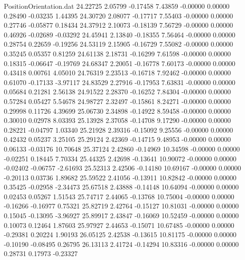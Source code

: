 \begin{filecontents}{PositionOrientation.dat}
  24.22725    2.05799   -0.17458     7.43859   -0.00000    0.00000    0.28490   -0.03235    1.44395
  24.30720    2.08077   -0.17717     7.55403   -0.00000    0.00000    0.27746   -0.05877    0.18434
  24.37912    2.10073   -0.18139     7.56729   -0.00000    0.00000    0.46926   -0.02689   -0.03292
  24.45941    2.13840   -0.18355     7.56464   -0.00000    0.00000    0.28754    0.22659   -0.19256
  24.53119    2.15905   -0.16729     7.55082   -0.00000    0.00000    0.35245    0.05357    0.81259
  24.61138    2.18731   -0.16299     7.61598   -0.00000    0.00000    0.18315   -0.06647   -0.19769
  24.68347    2.20051   -0.16778     7.60173   -0.00000    0.00000    0.43418    0.00761    4.05010
  24.76319    2.23513   -0.16718     7.92462   -0.00000    0.00000    0.61070   -0.17133   -3.97117
  24.83529    2.27916   -0.17953     7.63831   -0.00000    0.00000    0.05684    0.21281    2.56138
  24.91522    2.28370   -0.16252     7.84304   -0.00000    0.00000    0.57284    0.05427    5.54678
  24.98727    2.32497   -0.15861     8.24271   -0.00000    0.00000    0.29998    0.11726    4.39699
  25.06730    2.34898   -0.14922     8.59458   -0.00000    0.00000    0.30010    0.02978    8.03393
  25.13928    2.37058   -0.14708     9.17290   -0.00000    0.00000    0.28221   -0.04797    1.03340
  25.21928    2.39316   -0.15092     9.25556   -0.00000    0.00000    0.42432    0.05237    3.25105
  25.29124    2.42369   -0.14715     9.48953   -0.00000    0.00000    0.06133   -0.03176   10.70648
  25.37124    2.42860   -0.14969    10.34598   -0.00000    0.00000   -0.02251    0.18445    7.70334
  25.44325    2.42698   -0.13641    10.90072   -0.00000    0.00000   -0.02402   -0.06757   -2.61693
  25.52313    2.42506   -0.14180    10.69167   -0.00000    0.00000   -0.20113    0.03736    1.89682
  25.59522    2.41056   -0.13911    10.82842   -0.00000    0.00000    0.35425   -0.02958   -2.34473
  25.67518    2.43888   -0.14148    10.64094   -0.00000    0.00000    0.02453    0.05267    1.51543
  25.74717    2.44065   -0.13768    10.75004   -0.00000    0.00000   -0.16266   -0.16977    0.75321
  25.82719    2.42764   -0.15127    10.81031   -0.00000    0.00000    0.15045   -0.13095   -3.96927
  25.89917    2.43847   -0.16069    10.52459   -0.00000    0.00000    0.10073    0.12464    1.87603
  25.97927    2.44653   -0.15071    10.67485   -0.00000    0.00000   -0.29381    0.20224    1.90193
  26.05125    2.42538   -0.13615    10.81175   -0.00000    0.00000   -0.10190   -0.08495    0.26795
  26.13113    2.41724   -0.14294    10.83316   -0.00000    0.00000    0.28731    0.17973   -0.23327

\end{filecontents}

